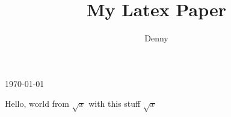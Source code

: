 \documentclass{article}
\begin{document}
\title{My  Latex Paper}
\today
\author{Denny} 
\maketitle
Hello, world from $\sqrt{x}$ with this stuff $\sqrt{x}$
\end{document}
